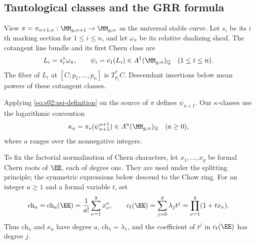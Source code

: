 \subsection{Tautological classes and the GRR formula}
\label{subsec:s02:02}

View $\pi=\pi_{n+1,n}:\MM_{g,n+1}\to\MM_{g,n}$ as the universal
stable curve.  Let $s_i$ be its $i$th marking section for
$1\leq i\leq n$, and let $\omega_\pi$ be its relative dualizing
sheaf.  The cotangent line
bundle and its first Chern class are
\begin{equation}
\label{eq:s02:psi-definition}
L_i=s_i^*\omega_\pi,
\qquad
\psi_i=c_1(L_i)\in A^1(\MM_{g,n})_{\mathbb Q}
\quad(1\leq i\leq n).
\end{equation}
The fiber of $L_i$ at $[C;p_1,\ldots,p_n]$ is $T_{p_i}^*C$.
Descendant insertions below mean powers of these cotangent classes.

Applying \eqref{eq:s02:psi-definition} on the source of $\pi$ defines
$\psi_{n+1}$.  Our $\kappa$-classes use the logarithmic
convention
\begin{equation}
\label{eq:s02:kappa-definition}
\kappa_a=\pi_*(\psi_{n+1}^{a+1})
\in A^a(\MM_{g,n})_{\mathbb Q}
\quad(a\geq0),
\end{equation}
where $a$ ranges over the nonnegative integers.

To fix the factorial normalization of Chern characters, let
$x_1,\ldots,x_g$ be formal Chern roots of $\EE$, each of degree one.
They are used under the splitting principle; the symmetric expressions
below descend to the Chow ring.  For an integer $a\geq1$ and a formal
variable $t$, set
\begin{equation}
\label{eq:s02:chern-definitions}
\mathrm{ch}_a=\mathrm{ch}_a(\EE)
=\frac{1}{a!}\sum_{\nu=1}^g x_\nu^a,
\qquad
c_t(\EE)=\sum_{j=0}^g\lambda_jt^j
=\prod_{\nu=1}^g(1+tx_\nu).
\end{equation}
Thus $\mathrm{ch}_a$ and $\kappa_a$ have degree $a$,
$\mathrm{ch}_1=\lambda_1$, and the coefficient of $t^j$ in
$c_t(\EE)$ has degree $j$.

